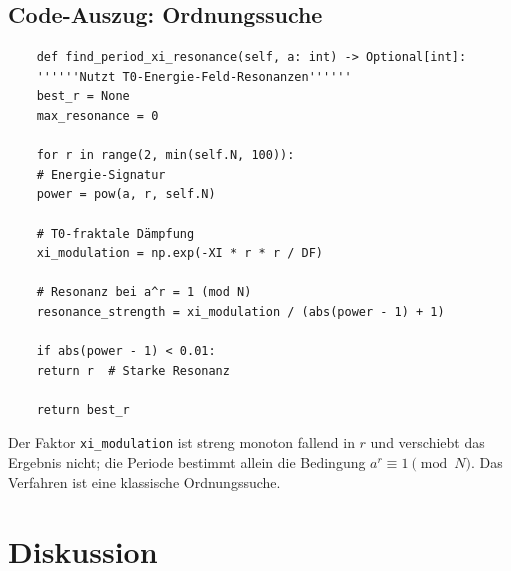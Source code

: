 \begin{table}[h]
	\centering
	\caption{T0-Shor-Leistung auf Benchmark-Suite}
	\label{tab:benchmark}
\end{table}

\subsection{Code-Auszug: Ordnungssuche}

\begin{lstlisting}
	def find_period_xi_resonance(self, a: int) -> Optional[int]:
	''''''Nutzt T0-Energie-Feld-Resonanzen''''''
	best_r = None
	max_resonance = 0
	
	for r in range(2, min(self.N, 100)):
	# Energie-Signatur
	power = pow(a, r, self.N)
	
	# T0-fraktale Dämpfung
	xi_modulation = np.exp(-XI * r * r / DF)
	
	# Resonanz bei a^r = 1 (mod N)
	resonance_strength = xi_modulation / (abs(power - 1) + 1)
	
	if abs(power - 1) < 0.01:
	return r  # Starke Resonanz
	
	return best_r
\end{lstlisting}

Der Faktor \texttt{xi\_modulation} ist streng monoton fallend in $r$ und verschiebt das Ergebnis nicht; die Periode bestimmt allein die Bedingung $a^r \equiv 1 \pmod{N}$. Das Verfahren ist eine klassische Ordnungssuche.

\section{Diskussion}

